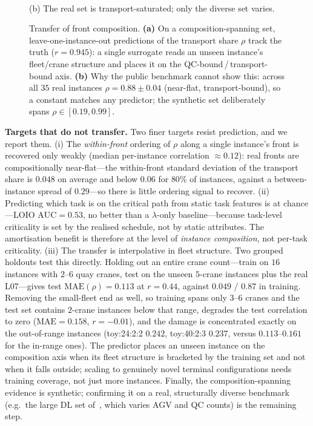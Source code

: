\documentclass[11pt]{article}
\begin{document}
\begin{figure}[t]
\begin{minipage}{0.49\textwidth}
\\[-2pt]
{\footnotesize (b) The real set is transport-saturated; only the diverse set varies.}
\end{minipage}
\caption{Transfer of front composition. \textbf{(a)} On a composition-spanning set,
leave-one-instance-out predictions of the transport share $\rho$ track the truth
($r=0.945$): a single surrogate reads an unseen instance's fleet/crane structure and places
it on the QC-bound\,/\,transport-bound axis. \textbf{(b)} Why the public benchmark cannot
show this: across all $35$ real instances $\rho=0.88\pm0.04$ (near-flat, transport-bound),
so a constant matches any predictor; the synthetic set deliberately spans
$\rho\in[0.19,0.99]$.}
\label{fig:amortise}
\end{figure}

\textbf{Targets that do not transfer.} Two finer targets resist prediction, and we report
them. (i) The \emph{within-front} ordering of $\rho$ along a single instance's front is
recovered only weakly (median per-instance correlation ${\approx}0.12$): real fronts are
compositionally near-flat---the within-front standard deviation of the transport share is
$0.048$ on average and below $0.06$ for $80\%$ of instances, against a between-instance
spread of $0.29$---so there is little ordering signal to recover. (ii) Predicting which
task is on the critical path from static task features is at chance---LOIO
$\mathrm{AUC}=0.53$, no better than a $\lambda$-only baseline---because task-level
criticality is set by the realised schedule, not by static attributes. The amortisation
benefit is therefore at the level of \emph{instance composition}, not per-task criticality.
(iii) The transfer is interpolative in fleet structure. Two grouped holdouts test this
directly. Holding out an entire crane count---train on $16$ instances with $2$--$6$ quay
cranes, test on the unseen $5$-crane instances plus the real \textsf{L07}---gives test
$\mathrm{MAE}(\rho)=0.113$ at $r=0.44$, against $0.049$ / $0.87$ in training. Removing the
small-fleet end as well, so training spans only $3$--$6$ cranes and the test set contains
$2$-crane instances below that range, degrades the test correlation to zero
($\mathrm{MAE}=0.158$, $r=-0.01$), and the damage is concentrated exactly on the
out-of-range instances (\textsf{toy:24:2:2} $0.242$, \textsf{toy:40:2:3} $0.237$, versus
$0.113$--$0.161$ for the in-range ones). The predictor places an unseen instance on the
composition axis when its fleet structure is bracketed by the training set and not when it
falls outside; scaling to genuinely novel terminal configurations needs training coverage,
not just more instances.
Finally, the composition-spanning evidence is synthetic; confirming it on a real,
structurally diverse benchmark (e.g.\ the large \textsf{DL} set
of~\cite{homayouni2022book}, which varies AGV and QC counts) is the remaining step.
\end{document}
